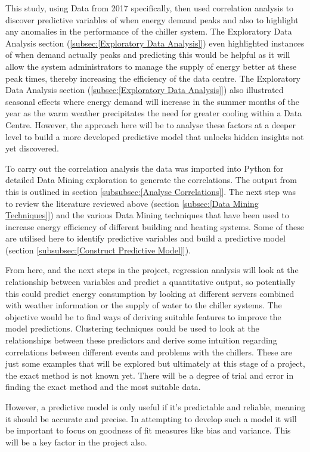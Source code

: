 \documentclass[12pt]{scrartcl}
\begin{document}
This study, using Data from 2017 specifically, then used correlation analysis to discover predictive variables of when energy demand peaks and also to highlight any anomalies in the performance of the chiller system. The Exploratory Data Analysis section (\ref{subsec:[Exploratory Data Analysis]}) even highlighted instances of when demand actually peaks and predicting this would be helpful as it will allow the system administrators to manage the supply of energy better at these peak times, thereby increasing the efficiency of the data centre. The Exploratory Data Analysis section (\ref{subsec:[Exploratory Data Analysis]}) also illustrated seasonal effects where energy demand will increase in the summer months of the year as the warm weather precipitates the need for greater cooling within a Data Centre. However, the approach here will be to analyse these factors at a deeper level to build a more developed predictive model that unlocks hidden insights not yet discovered.

To carry out the correlation analysis the data was imported into Python for detailed Data Mining exploration to generate the correlations. The output from this is outlined in section \ref{subsubsec:[Analyse Correlations]}. The next step was to review the literature reviewed above (section \ref{subsec:[Data Mining Techniques]}) and the various Data Mining techniques that have been used to increase energy efficiency of different building and heating systems. Some of these are utilised here to identify predictive variables and build a predictive model (section \ref{subsubsec:[Construct Predictive Model]}).

From here, and the next steps in the project, regression analysis will look at the relationship between variables and predict a quantitative output, so potentially this could predict energy consumption by looking at different servers combined with weather information or the supply of water to the chiller systems. The objective would be to find ways of deriving suitable features to improve the model predictions. Clustering techniques could be used to look at the relationships between these predictors and derive some  intuition regarding correlations between different events and problems with the chillers. These are just some examples that will be explored but ultimately at this stage of a project, the exact method is not known yet. There will be a degree of trial and error in finding the exact method and the most suitable data. 

However, a predictive model is only useful if it's predictable and reliable, meaning it should be accurate and precise. In attempting to develop such a model it will be important to focus on goodness of fit measures like bias and variance. This will be a key factor in the project also.
\end{document}
